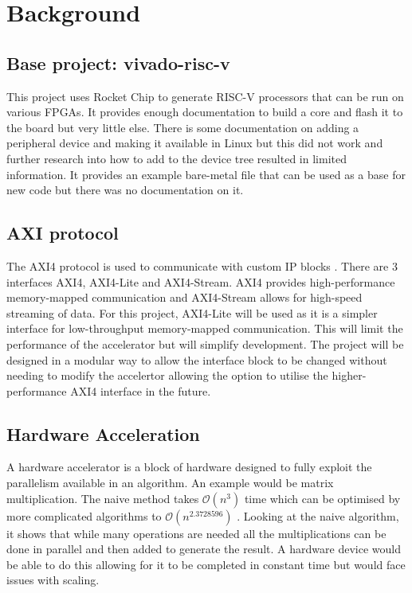 \section{Background}
\label{sec:background}

\subsection{Base project: vivado-risc-v}
This project uses Rocket Chip to generate RISC-V processors that can be run on various FPGAs. It provides enough documentation to build a core and flash it to the board but very little else. There is some documentation on adding a peripheral device and making it available in Linux but this did not work and further research into how to add to the device tree resulted in limited information. It provides an example bare-metal file that can be used as a base for new code but there was no documentation on it.

\subsection{AXI protocol}
The AXI4 protocol is used to communicate with custom IP blocks \cite{axi}. There are 3 interfaces AXI4, AXI4-Lite and AXI4-Stream. AXI4 provides high-performance memory-mapped communication and AXI4-Stream allows for high-speed streaming of data. For this project, AXI4-Lite will be used as it is a simpler interface for low-throughput memory-mapped communication. This will limit the performance of the accelerator but will simplify development. The project will be designed in a modular way to allow the interface block to be changed without needing to modify the accelertor allowing the option to utilise the higher-performance AXI4 interface in the future.

\subsection{Hardware Acceleration}
A hardware accelerator is a block of hardware designed to fully exploit the parallelism available in an algorithm. An example would be matrix multiplication. The naive method takes $\mathcal{O}(n^{3})$ time which can be optimised by more complicated algorithms to $\mathcal{O}(n^{2.3728596})$ \citep{alman2020refined}. Looking at the naive algorithm, it shows that while many operations are needed all the multiplications can be done in parallel and then added to generate the result. A hardware device would be able to do this allowing for it to be completed in constant time but would face issues with scaling.

